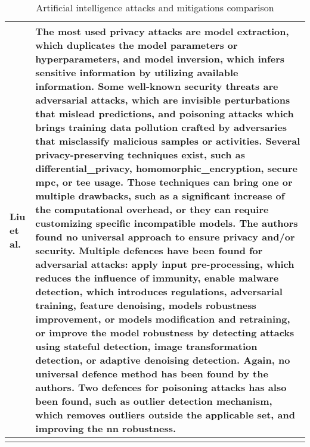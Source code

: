 \begin{small}
\begin{landscape}
\begin{longtable}{p{1.5cm}|p{20.7cm}}
		Liu et al. \cite{liu_privacy_2021} & The most used privacy attacks are model extraction, which duplicates the model \gls{parameters} or \gls{hyperparameters}, and model inversion, which infers sensitive information by utilizing available information. Some well-known security threats are adversarial attacks, which are invisible perturbations that mislead predictions, and poisoning attacks which brings training data pollution crafted by adversaries that misclassify malicious samples or activities. Several privacy-preserving techniques exist, such as \gls{differential_privacy}, \gls{homomorphic_encryption}, secure \gls{mpc}, or \gls{tee} usage. Those techniques can bring one or multiple drawbacks, such as a significant increase of the computational overhead, or they can require customizing specific incompatible models. The authors found no universal approach to ensure privacy and/or security. Multiple defences have been found for adversarial attacks: apply input pre-processing, which reduces the influence of immunity, enable malware detection, which introduces regulations, adversarial training, feature denoising, models robustness improvement, or models modification and retraining, or improve the model robustness by detecting attacks using stateful detection, image transformation detection, or adaptive denoising detection. Again, no universal defence method has been found by the authors. Two defences for poisoning attacks has also been found, such as outlier detection mechanism, which removes outliers outside the applicable set, and improving the \gls{nn} robustness. \\ %
		\bottomrule[0.8mm]
		\caption{Artificial intelligence attacks and mitigations comparison}
		\label{table:state_review_results_artificialintelligence} 
	\end{longtable}

	\newpage


\end{landscape}
\end{small}
